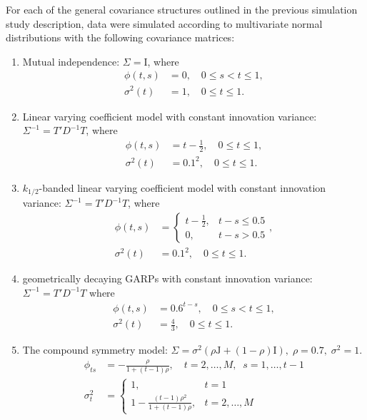 
For each of the general covariance structures outlined in the previous simulation study description, data were simulated according to multivariate normal distributions with the following covariance matrices: 
\begin{enumerate} \label{simulation-model-list}
\item\label{item:cov-type-1} Mutual independence: $\Sigma = \mathrm{I}$, where 
\begin{align*}
\phi\left(t,s\right) &= 0, \quad 0 \le s < t \le 1,\\ 
\sigma^2\left(t\right) &= 1, \quad 0 \le t \le 1.
\end{align*}
\item \label{item:cov-type-2} Linear varying coefficient model with constant innovation variance: $\Sigma^{-1} = T' D^{-1} T$, where 
\begin{align*}
\phi\left(t,s\right) &= t - \frac{1}{2},  \quad 0 \le t \le 1, \\
\sigma^2\left(t\right) &= 0.1^2,  \quad 0 \le t \le 1.
\end{align*}
{}
\item \label{item:cov-type-3} $k_{1/2}$-banded linear varying coefficient model with constant innovation variance: $\Sigma^{-1} = T' D^{-1} T$, where
\begin{align*}
\phi\left(t,s\right) &= \left\{\begin{array}{ll} t - \frac{1}{2}, & t - s \le 0.5\\ 
0, & t - s > 0.5\end{array}\right.,\\
\sigma^2\left(t\right) &= 0.1^2, \quad 0 \le t \le 1.
\end{align*}
\item \label{item:cov-type-4} geometrically decaying GARPs with constant innovation variance: $\Sigma^{-1} = T' D^{-1} T$ where 
\begin{align*}
\phi\left(t,s\right) &= 0.6^{t - s}, \quad 0 \le s < t \le 1,\\
\sigma^2\left(t\right) &= \frac{4}{3}, \quad 0 \le t \le 1.
\end{align*}
\item \label{item:cov-type-5} The compound symmetry model: $\Sigma = \sigma^2\left(\rho \mathrm{J} + \left(1-\rho\right)\mathrm{I}\right),\; \rho=0.7,\;\sigma^2=1$. 
\begin{align*}
\phi_{ts} &= -\frac{\rho}{1 + \left(t-1\right)\rho}, \quad t = 2, \dots, M,\;\; s = 1, \dots, t-1\\
\sigma_t^2 &= \left\{\begin{array}{ll} 1, & t = 1\\ 1 -\frac{\left(t-1\right)\rho^2}{1 + \left(t-1\right)\rho}, & t = 2, \dots, M \end{array}\right.
\end{align*}
\end{enumerate}
 



